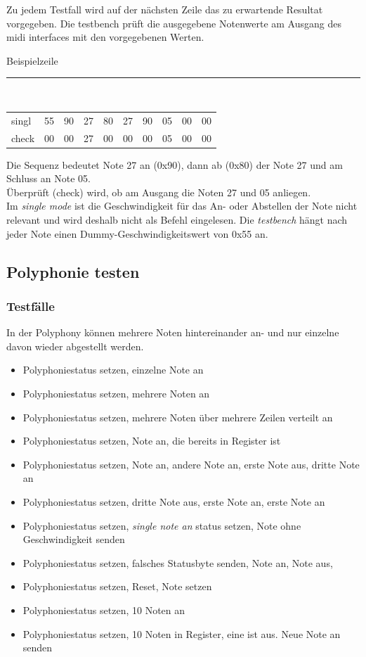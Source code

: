 Zu jedem Testfall wird auf der nächsten Zeile das zu erwartende Resultat vorgegeben. Die testbench prüft die ausgegebene Notenwerte am Ausgang des midi interfaces mit den vorgegebenen Werten.

Beispielzeile\\
\rule{\textwidth}{0.4pt}\\
{
\renewcommand{\arraystretch}{1.0} %
\begin{tabular*}{\textwidth}{@{}@{\extracolsep{\fill}}*{10}{l}@{}} %
singl & 55 & 90 & 27 & 80 & 27 & 90 & 05 & 00 & 00\\
check & 00 & 00 & 27 & 00 & 00 & 00 & 05 & 00 & 00\\
\end{tabular*}
}

Die Sequenz bedeutet Note 27 an (0x90), dann ab (0x80) der Note 27 und am Schluss an Note 05. \\
Überprüft (check) wird, ob am Ausgang die Noten 27 und 05 anliegen.\\
Im \textit{single mode} ist die Geschwindigkeit für das An- oder Abstellen der Note nicht relevant und wird deshalb nicht als Befehl eingelesen. Die \textit{testbench} hängt nach jeder Note einen Dummy-Geschwindigkeitswert von 0x55 an.

\subsection{Polyphonie testen }\label{polyphonitest}

\subsubsection{Testfälle}

In der Polyphony können mehrere Noten hintereinander an- und nur einzelne davon wieder abgestellt werden.

\begin{itemize}
\item Polyphoniestatus setzen, einzelne Note an
\item Polyphoniestatus setzen, mehrere Noten an
\item Polyphoniestatus setzen, mehrere Noten über mehrere Zeilen verteilt an
\item Polyphoniestatus setzen, Note an, die bereits in Register ist
\item Polyphoniestatus setzen, Note an, andere Note an, erste Note aus, dritte Note an
\item Polyphoniestatus setzen, dritte Note aus, erste Note an, erste Note an
\item Polyphoniestatus setzen, \textit{single note an} status setzen, Note ohne Geschwindigkeit senden
\item Polyphoniestatus setzen, falsches Statusbyte senden, Note an, Note aus,
\item Polyphoniestatus setzen, Reset, Note setzen
\item Polyphoniestatus setzen, 10 Noten an
\item Polyphoniestatus setzen, 10 Noten in Register, eine ist aus. Neue Note an senden
\end{itemize}

